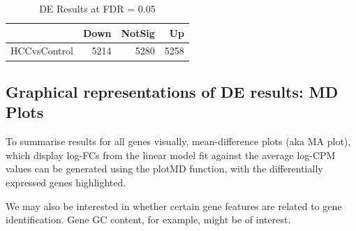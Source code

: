 \documentclass[
]{book}
\begin{document}
\begin{table}

\caption{\label{tab:lmFit}DE Results at FDR = 0.05}
\centering
\begin{tabular}[t]{l|r|r|r}
\hline
  & Down & NotSig & Up\\
\hline
HCCvsControl & 5214 & 5280 & 5258\\
\hline
\end{tabular}
\end{table}

\hypertarget{graphical-representations-of-de-results-md-plots}{%
\subsection*{Graphical representations of DE results: MD Plots}\label{graphical-representations-of-de-results-md-plots}}

To summarise results for all genes visually, mean-difference plots
(aka MA plot), which display log-FCs from the linear model fit against
the average log-CPM values can be generated using the plotMD function,
with the differentially expressed genes highlighted.

We may also be interested in whether certain gene features are
related to gene identification. Gene GC content, for example, might be
of interest.
\end{document}
